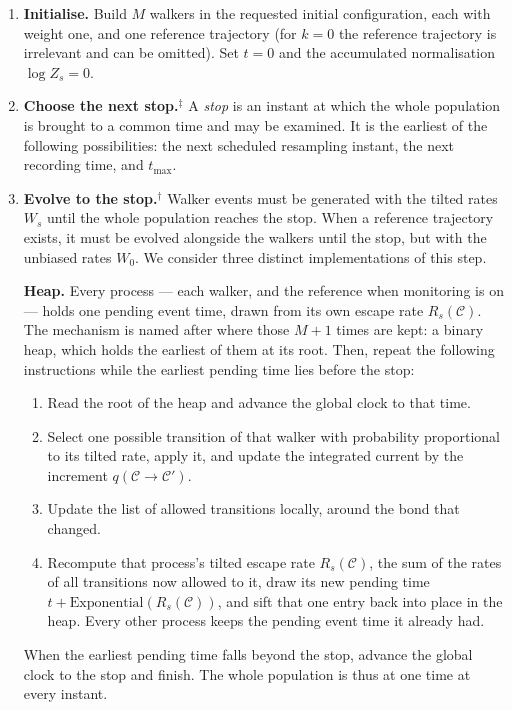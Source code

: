 \documentclass[11pt]{article}
\begin{document}
\begin{mdframed}[
    linewidth=0.8pt,
    roundcorner=3pt,
    backgroundcolor=black!5,
    innerleftmargin=8pt,
    innerrightmargin=8pt,
    innertopmargin=8pt,
    innerbottommargin=8pt]
\begin{enumerate}
\item \textbf{Initialise.} Build $M$ walkers in the requested initial configuration, each with weight one, and one reference trajectory (for $k = 0$ the reference trajectory is irrelevant and can be omitted). Set $t = 0$ and the accumulated normalisation $\log Z_s = 0$.

\item \textbf{Choose the next stop.}$^{\ddagger}$ A \emph{stop} is an instant at which the whole population is brought to a common time and may be examined. It is the earliest of the following possibilities: the next scheduled resampling instant, the next recording time, and $t_{\max}$.

\item \textbf{Evolve to the stop.}$^{\dagger}$ Walker events must be generated with the tilted rates $W_s$ until the whole population reaches the stop. When a reference trajectory exists, it must be evolved alongside the walkers until the stop, but with the unbiased rates $W_0$. We consider three distinct implementations of this step.

\smallskip
\noindent\textcolor{heapcol}{\textbf{Heap.}} Every process --- each walker, and the reference when monitoring is on --- holds one pending event time, drawn from its own escape rate $R_s(\mathcal{C})$. The mechanism is named after where those $M+1$ times are kept: a binary heap, which holds the earliest of them at its root. Then, repeat the following instructions while the earliest pending time lies before the stop:
\begin{enumerate}
\item Read the root of the heap and advance the global clock to that time.
\item Select one possible transition of that walker with probability proportional to its tilted rate, apply it, and update the integrated current by the increment $q(\mathcal{C}\to\mathcal{C}')$.
\item Update the list of allowed transitions locally, around the bond that changed.
\item Recompute that process's tilted escape rate $R_s(\mathcal{C})$, the sum of the rates of all transitions now allowed to it, draw its new pending time $t + \text{Exponential}(R_s(\mathcal{C}))$, and sift that one entry back into place in the heap. Every other process keeps the pending event time it already had.
\end{enumerate}
When the earliest pending time falls beyond the stop, advance the global clock to the stop and finish. The whole population is thus at one time at every instant.


\end{enumerate}
\end{mdframed}
\end{document}

